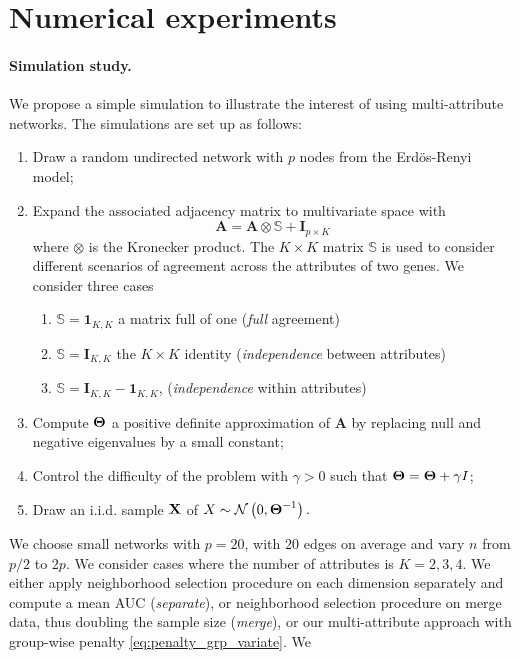 \section{Numerical  experiments}

\paragraph*{Simulation study.} We propose a simple simulation to
illustrate the interest of using multi-attribute networks.  The
simulations are set up as follows:
\begin{enumerate}
\item  Draw  a random  undirected  network  with  $p$ nodes  from  the
  Erdös-Renyi model;
\item  Expand the  associated adjacency  matrix to  multivariate space
  with
  $$\mathbf{A} = \mathbf{A}  \otimes \mathbb{S} + \mathbf{I}_{p\times K}$$
  where $\otimes$ is the Kronecker product. The $K\times K$ matrix
  $\mathbb{S}$ is used to consider different scenarios of agreement
  across the attributes of two genes. We consider three cases
  \begin{enumerate}
  \item $\mathbb{S} = \mathbf{1}_{K,K}$ a matrix full of one (\emph{full} agreement)
  \item $\mathbb{S} = \mathbf{I}_{K,K}$ the $K\times K$ identity (\emph{independence} between  attributes)
  \item $\mathbb{S} = \mathbf{I}_{K,K} - \mathbf{1}_{K,K}$,
    (\emph{independence} within attributes)
  \end{enumerate}
\item Compute $\boldsymbol\Theta$ a positive definite approximation of
  $\mathbf{A}$ by replacing null and negative eigenvalues by a small constant;
\item Control the difficulty of  the problem with $\gamma>0$ such that
  $\boldsymbol\Theta= \boldsymbol\Theta+ \gamma I$;
\item Draw an i.i.d.  sample $\mathbf{X}$ of
  $X \sim \mathcal{N} \left( 0,\boldsymbol\Theta^{-1} \right) .$
\end{enumerate}
We choose small networks with $p=20$, with $20$ edges on average and
vary $n$ from $p/2$ to $2p$. We consider cases where the number of
attributes is $K=2,3,4$.  We either apply neighborhood selection
procedure on each dimension separately and compute a mean AUC
(\emph{separate}), or neighborhood selection procedure on merge data,
thus doubling the sample size (\emph{merge}), or our multi-attribute
approach with group-wise penalty \eqref{eq:penalty_grp_variate}.  We
